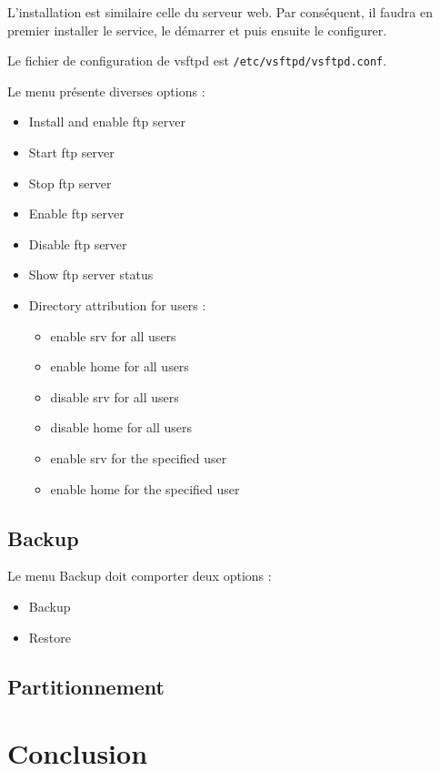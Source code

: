 \documentclass{article}
\begin{document}
	L'installation est similaire  celle du serveur web. Par conséquent, il faudra en premier installer le service, le démarrer et puis ensuite le configurer.
	
	Le fichier de configuration de vsftpd est \texttt{/etc/vsftpd/vsftpd.conf}.
	
	
	Le menu présente diverses options :
	\begin{itemize}
		\item Install and enable ftp server
		\item Start ftp server 
		\item Stop ftp server
		\item Enable ftp server
		\item Disable ftp server 
		\item Show ftp server status
		\item Directory attribution for users :
		\begin{itemize}
			\item enable srv for all users
			\item enable home for all users
			\item  disable srv for all users
			\item disable home for all users
			\item enable srv for the specified user
			\item enable home for the specified user
		\end{itemize}
	\end{itemize}
	
	\newpage
	
	\subsection{Backup}
	Le menu Backup doit comporter deux options :
	\begin{itemize}
		\item Backup
		\item Restore
	\end{itemize}
	
	\newpage
	
	\subsection{Partitionnement}
	
	\newpage
	\section{Conclusion}
\end{document}
